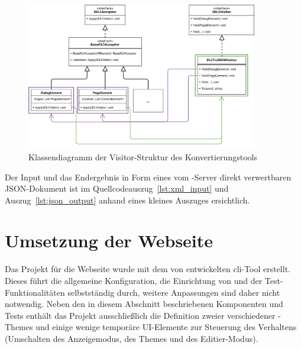 \begin{figure}[htb]
    \centering
    \captionsetup{justification=centering}
    \includegraphics[width=0.9\textwidth]{figures/web-converter_class-diagramm.png}
        \caption{Klassendiagramm der Visitor-Struktur des Konvertierungstools}\label{fig:web-conv_class-diagramm}
\end{figure}

Der Input und das Endergebnis in Form eines vom -Server direkt verwertbaren JSON-Dokument ist im Quellcodeauszug~\ref{lst:xml_input} und Auszug~\ref{lst:json_output} anhand eines kleines Auszuges ersichtlich.





\section{Umsetzung der Webseite}
Das Projekt für die Webseite wurde mit dem von  entwickelten \gls{cli}-Tool  erstellt. Dieses führt die allgemeine Konfiguration, die Einrichtung von  und der Test-Funktionalitäten selbstständig durch, weitere Anpassungen sind daher nicht notwendig. Neben den in diesem Abschnitt beschriebenen Komponenten und Tests enthält das Projekt ausschließlich die Definition zweier verschiedener -Themes und einige wenige temporäre UI-Elemente zur Steuerung des Verhaltens (Umschalten des Anzeigemodus, des Themes und des Editier-Modus).


